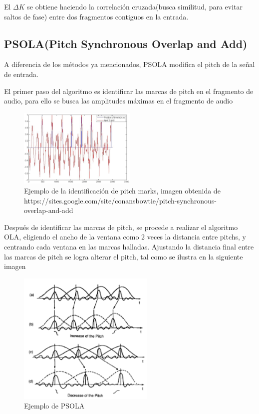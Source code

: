 \documentclass[../ASSD_TP2.tex]{subfiles}
\begin{document}
El $\Delta K$ se obtiene haciendo la correlación cruzada(busca similitud, para evitar saltos de fase) entre dos fragmentos contiguos en la entrada.

\subsection*{PSOLA(Pitch Synchronous Overlap and Add)}
A diferencia de los métodos ya mencionados, PSOLA modifica el pitch de la se\~nal de entrada.
\par El primer paso del algoritmo es identificar las marcas de pitch en el fragmento de audio, para ello se busca las amplitudes máximas en el fragmento de audio
\begin{figure}[H]
  \centering
   \includegraphics[width=0.5\textwidth]{figures/pitchm.png}
  \caption{Ejemplo de la identificación de pitch marks, imagen obtenida de https://sites.google.com/site/conansbowtie/pitch-synchronous-overlap-and-add}
\end{figure}
Después de identificar las marcas de pitch, se procede a realizar el algoritmo OLA, eligiendo el ancho de la ventana como 2 veces la distancia entre pitchs, y centrando cada ventana en las marcas halladas. Ajustando la distancia final entre las marcas de pitch se logra alterar el pitch, tal como se ilustra en la siguiente imagen

\begin{figure}[H]
  \centering
   \includegraphics[width=0.58\textwidth]{figures/psola.png}
  \caption{Ejemplo de PSOLA}
\end{figure}
\end{document}
